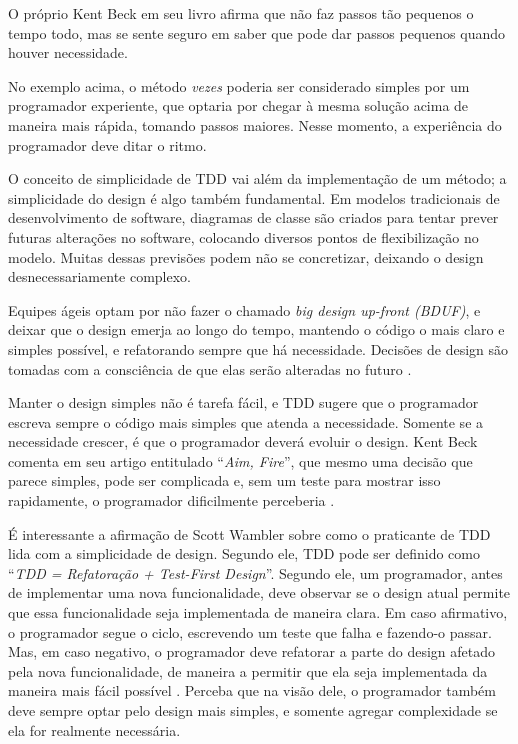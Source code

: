 O próprio Kent Beck em seu livro afirma que não faz passos tão pequenos o tempo
todo, mas se sente seguro em saber que pode dar passos pequenos quando houver
necessidade.

No exemplo acima, o método \textit{vezes} poderia ser considerado simples por
um programador experiente, que optaria por chegar à mesma solução acima de
maneira mais rápida, tomando passos maiores. Nesse momento, a experiência do
programador deve ditar o ritmo.

O conceito de simplicidade de TDD vai além da implementação de um método; a
simplicidade do design é algo também fundamental. Em modelos tradicionais de
desenvolvimento de software, diagramas de classe são criados para tentar prever
futuras alterações no software, colocando diversos pontos de flexibilização no
modelo. Muitas dessas previsões podem não se concretizar, deixando o design
desnecessariamente complexo.

Equipes ágeis optam por não fazer o chamado \textit{big design up-front (BDUF)},
e deixar que o design emerja ao longo do tempo, mantendo o código o mais claro e
simples possível, e refatorando sempre que há necessidade. Decisões de
design são tomadas com a consciência de que elas serão alteradas no futuro
\cite{is-design-dead}.

Manter o design simples não é tarefa fácil, e TDD sugere que o programador
escreva sempre o código mais simples que atenda a necessidade. Somente se a
necessidade crescer, é que o programador deverá evoluir o design. Kent Beck
comenta em seu artigo entitulado ``\textit{Aim, Fire}'', que mesmo uma decisão que
parece simples, pode ser complicada e, sem um teste para mostrar isso rapidamente, o
programador dificilmente perceberia \cite{aim-fire}. 

É interessante a afirmação de Scott Wambler sobre como o praticante de TDD lida
com a simplicidade de design. Segundo ele, TDD pode ser definido como
``\textit{TDD = Refatoração + Test-First Design}''. Segundo ele, um programador,
antes de implementar uma nova funcionalidade, deve observar se o design atual
permite que essa funcionalidade seja implementada de maneira clara. Em caso
afirmativo, o programador segue o ciclo, escrevendo um teste que falha e
fazendo-o passar. Mas, em caso negativo, o programador deve refatorar a parte do
design afetado pela nova funcionalidade, de maneira a permitir que ela seja
implementada da maneira mais fácil possível \cite{wambler-tdd}. Perceba que na
visão dele, o programador também deve sempre optar pelo design mais simples, e
somente agregar complexidade se ela for realmente necessária.


